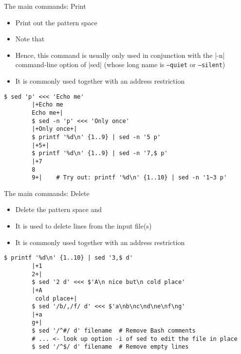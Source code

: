 \begin{frame}[fragile]{The main commands: Print}
    \vspace{-3mm}
    \begin{itemize}
        \item Print out the pattern space
        \item Note that 
        \item Hence, this command is usually only used in conjunction with the \bash|-n| command-line option of \bash|sed| (whose long name is \texttt{--quiet} or \texttt{--silent})
        \item It is commonly used together with an address restriction
    \end{itemize}
    \begin{lstlisting}[style=MyBash]
        $ sed 'p' <<< 'Echo me'
        |+Echo me
        Echo me+|
        $ sed -n 'p' <<< 'Only once'
        |+Only once+|
        $ printf '%d\n' {1..9} | sed -n '5 p'
        |+5+|
        $ printf '%d\n' {1..9} | sed -n '7,$ p'
        |+7
        8
        9+|    # Try out: printf '%d\n' {1..10} | sed -n '1~3 p'
    \end{lstlisting}
\end{frame}
\begin{frame}[fragile]{The main commands: Delete}
    \vspace{-3mm}
    \begin{itemize}
        \item Delete the pattern space and 
        \item It is used to delete lines from the input file(s)
        \item It is commonly used together with an address restriction
    \end{itemize}
    \medskip
    \begin{lstlisting}[style=MyBash]
        $ printf '%d\n' {1..10} | sed '3,$ d'
        |+1
        2+|
        $ sed '2 d' <<< $'A\n nice but\n cold place'
        |+A
         cold place+|
        $ sed '/b/,/f/ d' <<< $'a\nb\nc\nd\ne\nf\ng'
        |+a
        g+|
        $ sed '/^#/ d' filename  # Remove Bash comments
        # ... <- look up option -i of sed to edit the file in place
        $ sed '/^$/ d' filename  # Remove empty lines
    \end{lstlisting}
\end{frame}
